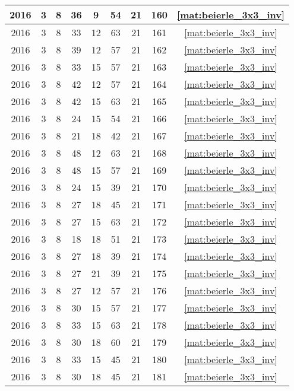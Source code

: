 \begin{longtable}{|c|c|c|c|c|c|c|c|c|}
2016 & 3 & 8 & 36 & 9 & 54 & 21 & 160 & \eqref{mat:beierle_3x3_inv} \\ \hline 
2016 & 3 & 8 & 33 & 12 & 63 & 21 & 161 & \eqref{mat:beierle_3x3_inv} \\ \hline 
2016 & 3 & 8 & 39 & 12 & 57 & 21 & 162 & \eqref{mat:beierle_3x3_inv} \\ \hline 
2016 & 3 & 8 & 33 & 15 & 57 & 21 & 163 & \eqref{mat:beierle_3x3_inv} \\ \hline 
2016 & 3 & 8 & 42 & 12 & 57 & 21 & 164 & \eqref{mat:beierle_3x3_inv} \\ \hline 
2016 & 3 & 8 & 42 & 15 & 63 & 21 & 165 & \eqref{mat:beierle_3x3_inv} \\ \hline 
2016 & 3 & 8 & 24 & 15 & 54 & 21 & 166 & \eqref{mat:beierle_3x3_inv} \\ \hline 
2016 & 3 & 8 & 21 & 18 & 42 & 21 & 167 & \eqref{mat:beierle_3x3_inv} \\ \hline 
2016 & 3 & 8 & 48 & 12 & 63 & 21 & 168 & \eqref{mat:beierle_3x3_inv} \\ \hline 
2016 & 3 & 8 & 48 & 15 & 57 & 21 & 169 & \eqref{mat:beierle_3x3_inv} \\ \hline 
2016 & 3 & 8 & 24 & 15 & 39 & 21 & 170 & \eqref{mat:beierle_3x3_inv} \\ \hline 
2016 & 3 & 8 & 27 & 18 & 45 & 21 & 171 & \eqref{mat:beierle_3x3_inv} \\ \hline 
2016 & 3 & 8 & 27 & 15 & 63 & 21 & 172 & \eqref{mat:beierle_3x3_inv} \\ \hline 
2016 & 3 & 8 & 18 & 18 & 51 & 21 & 173 & \eqref{mat:beierle_3x3_inv} \\ \hline 
2016 & 3 & 8 & 27 & 18 & 39 & 21 & 174 & \eqref{mat:beierle_3x3_inv} \\ \hline 
2016 & 3 & 8 & 27 & 21 & 39 & 21 & 175 & \eqref{mat:beierle_3x3_inv} \\ \hline 
2016 & 3 & 8 & 27 & 12 & 57 & 21 & 176 & \eqref{mat:beierle_3x3_inv} \\ \hline 
2016 & 3 & 8 & 30 & 15 & 57 & 21 & 177 & \eqref{mat:beierle_3x3_inv} \\ \hline 
2016 & 3 & 8 & 33 & 15 & 63 & 21 & 178 & \eqref{mat:beierle_3x3_inv} \\ \hline 
2016 & 3 & 8 & 30 & 18 & 60 & 21 & 179 & \eqref{mat:beierle_3x3_inv} \\ \hline 
2016 & 3 & 8 & 33 & 15 & 45 & 21 & 180 & \eqref{mat:beierle_3x3_inv} \\ \hline 
2016 & 3 & 8 & 30 & 18 & 45 & 21 & 181 & \eqref{mat:beierle_3x3_inv} \\ \hline 

\end{longtable}
